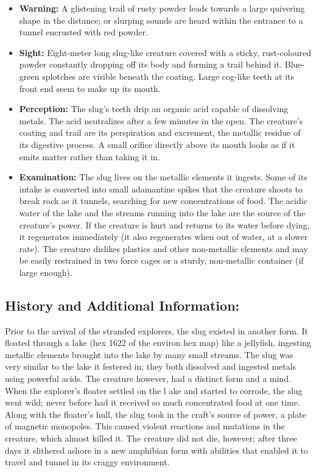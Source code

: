 \begin{itemize}
\item \textbf{Warning:} A glistening trail of rusty powder leads
  towards a large quivering shape in the distance; or slurping sounds
  are heard within the entrance to a tunnel encrusted with red powder.
\item \textbf{Sight:} Eight-meter long slug-like creature covered with
  a sticky, rust-coloured powder constantly dropping off its body and
  forming a trail behind it. Blue-green splotches are visible beneath
  the coating. Large cog-like teeth at its front end seem to make up
  its mouth.
\item \textbf{Perception:} The slug's teeth drip an organic acid
  capable of dissolving metals. The acid neutralizes after a few
  minutes in the open.  The creature's coating and trail are its
  perspiration and excrement, the metallic residue of its digestive
  process. A small orifice directly above its mouth looks as if it
  emits matter rather than taking it in.
\item \textbf{Examination:} The slug lives on the metallic elements it
  ingests. Some of its intake is converted into small adamantine
  spikes that the creature shoots to break rock as it tunnels,
  searching for new concentrations of food. The acidic water of the
  lake and the streams running into the lake are the source of the
  creature's power. If the creature is hurt and returns to its water
  before dying, it regenerates immediately (it also regenerates when
  out of water, at a slower rate). The creature dislikes plastics and
  other non-metallic elements and may be easily restrained in two
  force cages or a sturdy, non-metallic container (if large enough).
\end{itemize}


\subsection*{History and Additional Information:}
\label{sec:hist-addit-inform}

Prior to the arrival of the stranded explorers, the slug existed in
another form. It floated through a lake (hex 1622 of the environ hex
map) like a jellyfish, ingesting metallic elements brought into the
lake by many small streams. The slug was very similar to the lake it
festered in; they both dissolved and ingested metals using powerful
acids. The creature however, had a distinct form and a mind. When the
explorer's floater settled on the l ake and started to corrode, the
slug went wild; never before had it received so much concentrated food
at one time. Along with the floater's hull, the slug took in the
craft's source of power, a plate of magnetic monopoles. This caused
violent reactions and mutations in the creature, which almost killed
it. The creature did not die, however; after three days it slithered
ashore in a new amphibian form with abilities that enabled it to
travel and tunnel in its craggy environment.

